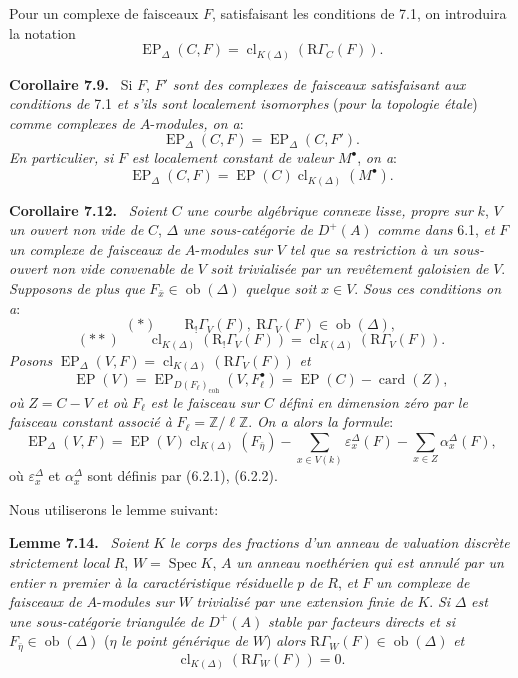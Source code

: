 \documentclass[11pt]{article}
\newenvironment{statement}[1]{\par\medskip\noindent\textbf{#1.}\ }{\par\medskip}
\DeclareMathOperator{\Spec}{Spec}
\newcommand{\R}{\mathrm{R}}\newcommand{\RHomCore}{\mathrm{RHom}}
\providecommand{\EP}{\operatorname{EP}}
\providecommand{\coh}{\mathrm{coh}}
\providecommand{\Ob}{\operatorname{ob}}
\providecommand{\Ob}{\operatorname{ob}}
\providecommand{\R}{\mathrm R}
\providecommand{\Spec}{\operatorname{Spec}}
\providecommand{\EP}{\operatorname{EP}}
\providecommand{\Spec}{\operatorname{Spec}}
\providecommand{\Ob}{\operatorname{Ob}}
\providecommand{\coh}{\mathrm{coh}}
\providecommand{\clK}[1]{\operatorname{cl}_{K(#1)}}
\providecommand{\Spec}{\operatorname{Spec}}
\providecommand{\Ob}{\operatorname{ob}}
\providecommand{\Spec}{\operatorname{Spec}}
\providecommand{\Ob}{\operatorname{Ob}}
\begin{document}
Pour un complexe de faisceaux $F$, satisfaisant les conditions de 7.1, on introduira la notation
\[
\EP_\Delta(C,F)=\clK{\Delta}(\mathrm{R}\Gamma_C(F)).
\]

\begin{statement}{Corollaire 7.9}
Si $F$, $F'$ \emph{sont des complexes de faisceaux satisfaisant aux conditions de} 7.1 \emph{et s'ils sont localement isomorphes} (\emph{pour la topologie étale}) \emph{comme complexes de} $A$-\emph{modules, on a}:
\[
\EP_\Delta(C,F)=\EP_\Delta(C,F').
\tag{7.10}
\]
\emph{En particulier, si} $F$ \emph{est localement constant de valeur} $M^\bullet$, \emph{on a}:
\[
\EP_\Delta(C,F)=\EP(C)\clK{\Delta}(M^\bullet).
\tag{7.11}
\]
\end{statement}

\begin{statement}{Corollaire 7.12}
\emph{Soient} $C$ \emph{une courbe algébrique connexe lisse, propre sur} $k$, $V$ \emph{un ouvert non vide de} $C$, $\Delta$ \emph{une sous-catégorie de} $D^+(A)$ \emph{comme dans} 6.1, \emph{et} $F$ \emph{un complexe de faisceaux de} $A$-\emph{modules} \emph{sur} $V$ \emph{tel que sa restriction à un sous-ouvert non vide convenable de} $V$ \emph{soit trivialisée par un revêtement galoisien de} $V$. \emph{Supposons de plus que} $F_{\bar x}\in\Ob(\Delta)$ \emph{quelque soit} $x\in V$. \emph{Sous ces conditions on a}:
\[
(*)\qquad \R_!\Gamma_V(F),\ \mathrm{R}\Gamma_V(F)\in\Ob(\Delta),
\]
\[
(**)\qquad
\clK{\Delta}(\R_!\Gamma_V(F))=\clK{\Delta}(\mathrm{R}\Gamma_V(F)).
\]
\emph{Posons} $\EP_\Delta(V,F)=\clK{\Delta}(\mathrm{R}\Gamma_V(F))$ \emph{et}
\[
\EP(V)=\EP_{D(F_\ell)_{\coh}}(V,F_\ell^\bullet)=\EP(C)-\operatorname{card}(Z),
\]
\emph{où} $Z=C-V$ \emph{et où} $F_\ell$ \emph{est le faisceau sur} $C$ \emph{défini en dimension zéro par le faisceau constant associé à} $F_\ell=\mathbb Z/\ell\mathbb Z$. \emph{On a alors la formule}:
\[
\EP_\Delta(V,F)
=
\EP(V)\clK{\Delta}(F_{\bar\eta})
-\sum_{x\in V(k)}\varepsilon_x^\Delta(F)
-\sum_{x\in Z}\alpha_x^\Delta(F),
\tag{7.13}
\]
où $\varepsilon_x^\Delta$ et $\alpha_x^\Delta$ sont
définis par (6.2.1), (6.2.2).
\end{statement}

Nous utiliserons le lemme suivant:

\begin{statement}{Lemme 7.14}
\emph{Soient} $K$ \emph{le corps des fractions d'un anneau de valuation discrète strictement local} $R$, $W=\Spec K$, $A$ \emph{un anneau noethérien qui est annulé par un entier} $n$ \emph{premier à la caractéristique résiduelle} $p$ \emph{de} $R$, \emph{et} $F$ \emph{un complexe de faisceaux de} $A$-\emph{modules sur} $W$ \emph{trivialisé par une extension finie de} $K$. \emph{Si} $\Delta$ \emph{est une sous-catégorie triangulée de} $D^+(A)$ \emph{stable par facteurs directs et si} $F_{\bar\eta}\in\Ob(\Delta)$ ($\eta$ \emph{le point générique de} $W$) \emph{alors} $\mathrm{R}\Gamma_W(F)\in\Ob(\Delta)$ \emph{et}
\[
\clK{\Delta}(\mathrm{R}\Gamma_W(F))=0.
\]
\end{statement}
\end{document}
